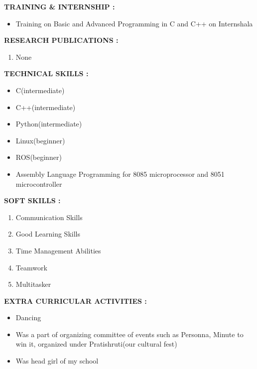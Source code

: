 \documentclass[12pt]{article}
\begin{document}
	\textbf{\textsc{TRAINING \& INTERNSHIP : }}
	\begin{itemize}
		\item Training on Basic and Advanced Programming in C and C++ on Internshala
	\end{itemize}
	\textbf{\textsc{RESEARCH PUBLICATIONS : }}
	\begin{enumerate}
		\item None
	\end{enumerate}
	\textbf{\textsc{TECHNICAL SKILLS : }}
	\begin{itemize}
		\item C(intermediate)
		\item C++(intermediate)
		\item Python(intermediate)
		\item Linux(beginner)
		\item ROS(beginner)
		\item Assembly Language Programming for 8085 microprocessor and 8051 microcontroller
	\end{itemize}
	\textbf{\textsc{SOFT SKILLS : }}
	\begin{enumerate}
		\item Communication Skills
		\item Good Learning Skills
		\item Time Management Abilities
		\item Teamwork
		\item Multitasker
	\end{enumerate}
	\textbf{\textsc{EXTRA CURRICULAR ACTIVITIES : }}
	\begin{itemize}
		\item Dancing
		\item Was a part of organizing committee of events such as Personna, Minute to win it, organized under Pratishruti(our cultural fest)
		\item Was head girl of my school
	\end{itemize}
\end{document}
